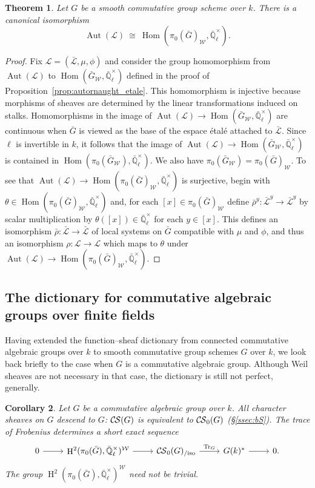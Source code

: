 \documentclass[10pt]{amsart}
\theoremstyle{plain}
\newtheorem{theorem}{Theorem}[section]
\newtheorem{corollary}[theorem]{Corollary}
\theoremstyle{definition}
\newcommand{\EE}{\mathbb{\bar Q}_\ell}
\newcommand{\Fq}{k}
\newcommand{\EEx}{\EE^\times}
\newcommand{\Weil}[1]{\mathcal{W}_{#1}}
\DeclareMathOperator{\Aut}{Aut}
\DeclareMathOperator{\Hom}{Hom}
\DeclareMathOperator{\Hh}{H}
\newcommand{\iso}{{\ \cong\ }}
\newcommand{\TrFrob}[1]{\operatorname{Tr}_{#1}}
\newcommand{\cs}[1]{{\mathcal{#1}}}
\newcommand{\gcs}[1]{{\mathcal{\bar #1}}}
\newcommand{\CS}{{\mathcal{C\hskip-0.8pt S}}}
\newcommand{\bCS}{{\CS_0}}
\newcommand{\bCSiso}[1]{\bCS(#1)_{/\text{iso}}}
\newcommand{\bG}{\bar{G}}
\begin{document}
\begin{theorem}\label{thm:autornaught}
Let $G$ be a smooth commutative group scheme over $\Fq$.
There is a canonical isomorphism
\[
\Aut(\cs{L}) \iso \Hom(\pi_0(\bG)_{\Weil{}},\EEx).
\]
\end{theorem}
\begin{proof} 
Fix $\cs{L} = (\gcs{L},\mu,\phi)$ and consider the group homomorphism from $\Aut(\cs{L})$ to $\Hom(\bG_{\Weil{}},\EEx)$
defined in the proof of Proposition~\ref{prop:autornaught_etale}.
This homomorphism is injective because morphisms of sheaves are determined by the linear transformations induced on stalks.  
Homomorphisms in the image of $\Aut(\cs{L}) \to \Hom(\bG_{\Weil{}},\EEx)$ are continuous when $\bG$ is
viewed as the base of the espace \'etal\'e attached to $\gcs{L}$.
Since $\ell$ is invertible in $\Fq$, it follows that the image of $\Aut(\cs{L}) \to \Hom(\bG_{\Weil{}},\EEx)$ is contained in $\Hom(\pi_0(\bG_{\Weil{}}),\EEx)$. 
We also have $\pi_0(\bG_{\Weil{}})=\pi_0(\bG)_{\Weil{}}$. 
To see that $\Aut(\cs{L}) \to \Hom(\pi_0(\bG)_{\Weil{}},\EEx)$ is surjective, begin with
$\theta\in\Hom(\pi_0(\bG)_{\Weil{}},\EEx)$ and, for each $[x] \in \pi_0(\bG)_{\Weil{}}$ define
$\bar\rho^y: \gcs{L}^y \to \gcs{L}^y$ by scalar multiplication by $\theta([x])\in \EEx$ for each $y\in [x]$.
This defines an isomorphism $\bar\rho : \gcs{L}\to \gcs{L}$ of local systems on $\bG$ compatible with $\mu$ and $\phi$,
and thus an isomorphism $\rho :\cs{L}\to \cs{L}$ which maps to $\theta$ under $\Aut(\cs{L}) \to \Hom(\pi_0(\bG)_{\Weil{}},\EEx)$.
\end{proof}

\subsection{The dictionary for commutative algebraic groups over finite fields}\label{ssec:alg_groups}

Having extended the function--sheaf dictionary from connected commutative algebraic groups over $\Fq$ to smooth
commutative group schemes $G$ over $\Fq$, we look back briefly to the case when $G$ is a commutative algebraic group. 
Although Weil sheaves are not necessary in that case, the dictionary is still not perfect, generally.

\begin{corollary}\label{cor:alg_groups}
Let $G$ be a commutative algebraic group over $\Fq$.
All character sheaves on $G$ descend to $G$: $\CS(G)$ is equivalent to $\bCS(G)$ (\S \ref{ssec:bS}).
The trace of Frobenius determines a short exact sequence
\[
\begin{tikzcd}
0 \arrow{r} & \Hh^2(\pi_0(\bG),\EEx)^{\Weil{}} \arrow{r} & \bCSiso{G} \arrow{r}{\TrFrob{G}} & G(\Fq)^* \arrow{r} & 0.
\end{tikzcd}
\]
The group $\Hh^2(\pi_0(\bG),\EEx)^{\Weil{}}$ need not be trivial.
\end{corollary}
\end{document}
